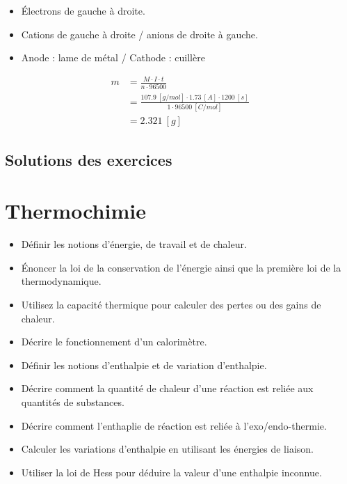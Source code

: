 \documentclass[
  11pt,
  a4paper,
  openany]{book}
\providecommand{\tightlist}{%
  \setlength{\itemsep}{0pt}\setlength{\parskip}{0pt}}
\begin{document}
\begin{Answer}

\begin{itemize}
\tightlist
\item
  Électrons de gauche à droite.
\item
  Cations de gauche à droite / anions de droite à gauche.
\item
  Anode : lame de métal / Cathode : cuillère
\end{itemize}

\[
\begin{split}
  m &= \frac{M \cdot I \cdot t}{n \cdot 96500} \\
  &= \frac{107.9\ [g/mol] \cdot 1.73\ [A] \cdot 1200\ [s]}{1 \cdot 96500\ [C/mol]} \\
  &= 2.321\ [g]
\end{split}
\]

\end{Answer}

\clearpage

\section{Solutions des exercices} \shipoutAnswer

\chapter{Thermochimie}\label{thermochimie}

\begin{objectives}

\begin{itemize}
\tightlist
\item
  Définir les notions d'énergie, de travail et de chaleur.
\item
  Énoncer la loi de la conservation de l'énergie ainsi que la première loi de la thermodynamique.
\item
  Utilisez la capacité thermique pour calculer des pertes ou des gains de chaleur.
\item
  Décrire le fonctionnement d'un calorimètre.
\item
  Définir les notions d'enthalpie et de variation d'enthalpie.
\item
  Décrire comment la quantité de chaleur d'une réaction est reliée aux quantités de substances.
\item
  Décrire comment l'enthaplie de réaction est reliée à l'exo/endo-thermie.
\item
  Calculer les variations d'enthalpie en utilisant les énergies de liaison.
\item
  Utiliser la loi de Hess pour déduire la valeur d'une enthalpie inconnue.
\end{itemize}

\end{objectives}
\end{document}
